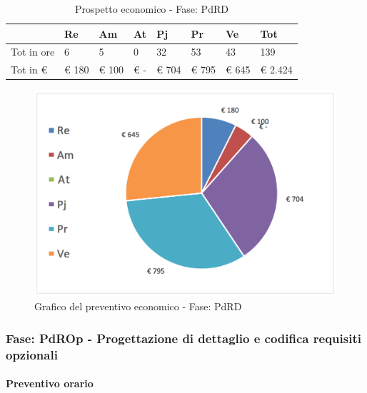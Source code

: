 							\begin{table}[H] \begin{center} \begin{tabular}{llllllll}
							\toprule
								&	\textbf{Re}	&	\textbf{Am}	&	\textbf{At}	&	\textbf{Pj}	&	\textbf{Pr}	&	\textbf{Ve}	&	\textbf{Tot}\\

							\midrule
							Tot in ore	&	6	&	5	&	0	&	32	&	53	&	43	&	139	 \\


							Tot in €	&	 €     180 	 & 	 €      100 	 & 	 €         -   	 & 	 €     704 	 & 	 €    795 	 & 	 €     645 	 & 	 €     2.424 	 \\
							\bottomrule
							\end{tabular} \end{center} \caption{Prospetto economico - Fase:
							PdRD
							}\label{tab:s_PdRD} \end{table}		\begin{figure}[H]  \centering  \includegraphics[scale=0.40]{img/s_PdRD}
									\caption{Grafico del preventivo economico - Fase: 								PdRD	}  \label{fig:s_PdRD} \end{figure}


		\newpage
		\subsubsection {Fase: PdROp - Progettazione di dettaglio e codifica requisiti opzionali}
		\paragraph{Preventivo orario}

